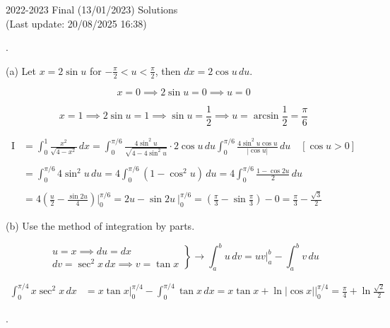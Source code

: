 \documentclass{article}
\begin{document}
\newpage

\begin{center}
2022-2023 Final (13/01/2023) Solutions\\
(Last update: 20/08/2025 16:38)
\end{center}

.

\hfill

\noindent (a) Let $x=2\sin u$ for $\displaystyle-\frac\pi2<u<\frac\pi2$, then $dx=2\cos u\,du$.

\[x=0\implies2\sin u=0\implies u=0\]

\[x=1\implies2\sin u=1\implies\sin u=\frac12\implies u=\arcsin\frac12=\frac\pi6\]

\begin{align*}
\mathrm{I}&=\int_0^1\frac{x^2}{\sqrt{4-x^2}}\,dx=\int_0^{\pi/6}\frac{4\sin^2u}{\sqrt{4-4\sin^2u}}\cdot2\cos u\,du\int_0^{\pi/6}\frac{4\sin^2u\cos u}{\left|\cos u\right|}\,du\quad\left[\cos u>0\right]\\\\&=\int_0^{\pi/6}4\sin^2u\,du=4\int_0^{\pi/6}\left(1-\cos^2u\right)\,du=4\int_0^{\pi/6}\frac{1-\cos2u}2\,du\\\\&=4\left(\frac u2-\frac{\sin 2u}4\right)\Bigg|_0^{\pi/6}=2u-\sin 2u\:\Bigg|_0^{\pi/6}=\left(\frac\pi3-\sin\frac\pi3\right)-0=\boxed{\frac\pi3-\frac{\sqrt3}2}
\end{align*}

\hfill

\noindent (b) Use the method of integration by parts.

\[\left.\begin{array}{c}
u=x\implies du=dx\\[1em]
dv=\sec^2x\,dx\implies\displaystyle v=\tan x
\end{array}\right\}\rightarrow\int_a^b u\,dv=uv\bigg|_a^b-\int_a^b v\,du\]

\begin{align*}\int_0^{\pi/4} x\sec^2x\,dx&=x\tan x\bigg|_0^{\pi/4}-\int_0^{\pi/4}\tan x\,dx=x\tan x+\ln\left|\cos x\right|\bigg|_0^{\pi/4}=\boxed{\frac\pi4+\ln\frac{\sqrt2}2}\end{align*}

\hfill

.

\hfill
\end{document}
